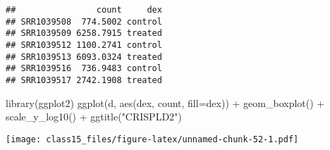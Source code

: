 \documentclass[
]{article}
\newenvironment{Shaded}{\begin{snugshade}}{\end{snugshade}}
\newcommand{\AttributeTok}[1]{\textcolor[rgb]{0.77,0.63,0.00}{#1}}
\newcommand{\FunctionTok}[1]{\textcolor[rgb]{0.00,0.00,0.00}{#1}}
\newcommand{\NormalTok}[1]{#1}
\newcommand{\SpecialCharTok}[1]{\textcolor[rgb]{0.00,0.00,0.00}{#1}}
\newcommand{\StringTok}[1]{\textcolor[rgb]{0.31,0.60,0.02}{#1}}
\begin{document}
\begin{verbatim}
##                count     dex
## SRR1039508  774.5002 control
## SRR1039509 6258.7915 treated
## SRR1039512 1100.2741 control
## SRR1039513 6093.0324 treated
## SRR1039516  736.9483 control
## SRR1039517 2742.1908 treated
\end{verbatim}

\begin{Shaded}
\begin{Highlighting}[]
\FunctionTok{library}\NormalTok{(ggplot2)}
\FunctionTok{ggplot}\NormalTok{(d, }\FunctionTok{aes}\NormalTok{(dex, count, }\AttributeTok{fill=}\NormalTok{dex)) }\SpecialCharTok{+} 
  \FunctionTok{geom\_boxplot}\NormalTok{() }\SpecialCharTok{+} 
  \FunctionTok{scale\_y\_log10}\NormalTok{() }\SpecialCharTok{+} 
  \FunctionTok{ggtitle}\NormalTok{(}\StringTok{"CRISPLD2"}\NormalTok{)}
\end{Highlighting}
\end{Shaded}

\texttt{[image: class15\_files/figure-latex/unnamed-chunk-52-1.pdf]}
\end{document}
